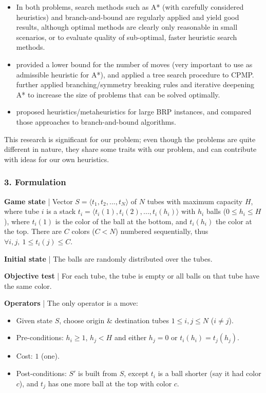 \documentclass{beamer}
\begin{document}
\begin{frame}
\begin{itemize}
\item In both problems, search methods such as A* (with carefully considered heuristics) and branch-and-bound are regularly applied and yield good results, although optimal methods are clearly only reasonable in small scenarios, or to evaluate quality of sub-optimal, faster heuristic search methods.

\item \cite{bortfeldt2012} provided a lower bound for the number of moves (very important to use as admissible heuristic for A*), and applied a tree search procedure to CPMP. \cite{tierney2017} further applied branching/symmetry breaking rules and iterative deepening A* to increase the size of problems that can be solved optimally.

\item \cite{tricoire2018} proposed heuristics/metaheuristics for large BRP instances, and compared those approaches to branch-and-bound algorithms.
\end{itemize}

This research is significant for our problem; even though the problems are quite different in nature, they share some traits with our problem, and can contribute with ideas for our own heuristics.

\end{frame}

\begin{frame}[fragile=singleslide]
\frametitle{3. Formulation}

\textbf{Game state} | Vector $S = \langle t_1, t_2, ..., t_N \rangle$ of $N$ tubes with maximum capacity $H$, where tube $i$ is a stack $t_i = \langle t_i(1), t_i(2), ..., t_i(h_i) \rangle$ with $h_i$ balls ($0 \leq h_i \leq H$), where $t_i(1)$ is the color of the ball at the bottom, and $t_i(h_i)$ the color at the top. There are $C$ colors ($C < N$) numbered sequentially, thus $\forall i, j,~1 \leq t_i(j) \leq C$.

\textbf{Initial state} | The balls are randomly distributed over the tubes.

\textbf{Objective test} | For each tube, the tube is empty or all balls on that tube have the same color.

\textbf{Operators} | The only operator is a move:
\begin{itemize}
  \item Given state $S$, choose origin \& destination tubes $1 \leq i, j \leq N$ ($i \neq j$).
  \item Pre-conditions: $h_i \geq 1$, $h_j < H$ and either $h_j = 0$ or $t_i(h_i)=t_j(h_j)$.
  \item Cost: $1$ (one).
  \item Post-conditions: $S'$ is built from $S$, except $t_i$ is a ball shorter (say it had color $c$), and $t_j$ has one more ball at the top with color $c$.
\end{itemize}

\end{frame}
\end{document}
